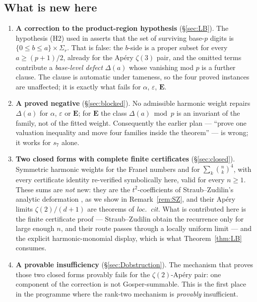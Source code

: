 \documentclass[11pt,reqno]{amsart}
\theoremstyle{plain}
\theoremstyle{definition}
\theoremstyle{remark}
\newcommand{\bin}[2]{\binom{#1}{#2}}
\numberwithin{equation}{section}
\begin{document}
\subsection{What is new here}
\begin{enumerate}[leftmargin=2em]
\item \textbf{A correction to the product-region hypothesis} (\S\ref{sec:LB}). The
  hypothesis (H2) used in \cite{CompanionLucas2nd} asserts that the set of surviving
  base-$p$ digits is $\{0\le b\le a\}\times\Sigma_r$. That is false: the $b$-side is a
  proper subset for every $a\ge(p+1)/2$, already for the Ap\'ery $\zeta(3)$ pair, and the
  omitted terms contribute a \emph{base-level defect} $\Delta(a)$ whose vanishing mod $p$
  is a further clause. The clause is automatic under tameness, so the four proved instances
  are unaffected; it is exactly what fails for $\alpha$, $\varepsilon$, $\mathbf E$.
\item \textbf{A proved negative} (\S\ref{sec:blocked}). No admissible harmonic weight
  repairs $\Delta(a)$ for $\alpha$, $\varepsilon$ or $\mathbf E$; for $\mathbf E$ the class
  $\Delta(a)\bmod p$ is an invariant of the family, not of the fitted weight. Consequently
  the earlier plan --- ``prove one valuation inequality and move four families inside the
  theorem'' --- is wrong; it works for $s_7$ alone.
\item \textbf{Two closed forms with complete finite certificates} (\S\ref{sec:closed}).
  Symmetric harmonic weights for the Franel numbers and for $\sum_k\bin nk^4$, with every
  certificate identity re-verified symbolically here, valid for every $n\ge1$. These sums
  are \emph{not} new: they are the $t^2$-coefficients of Straub--Zudilin's analytic
  deformation \cite{StraubZudilin}, as we show in Remark~\ref{rem:SZ}, and their Ap\'ery
  limits $\zeta(2)/(d+1)$ are theorems of \emph{loc.\ cit.} What is contributed here is the
  finite certificate proof --- Straub--Zudilin obtain the recurrence only for large enough
  $n$, and their route passes through a locally uniform limit --- and the explicit
  harmonic-monomial display, which is what Theorem~\ref{thm:LB} consumes.
\item \textbf{A provable insufficiency} (\S\ref{sec:Dobstruction}). The mechanism that
  proves those two closed forms provably fails for the $\zeta(2)$-Ap\'ery pair: one
  component of the correction is not Gosper-summable. This is the first place in the
  programme where the rank-two mechanism is \emph{provably} insufficient.
\end{enumerate}
\end{document}
